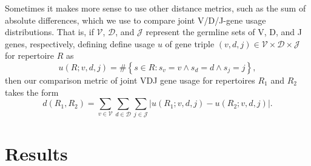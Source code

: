\documentclass{article}
\begin{document}
Sometimes it makes more sense to use other distance metrics, such as the sum of absolute differences, which we use to compare joint V/D/J-gene usage distributions.
That is, if $\mathcal V$, $\mathcal D$, and $\mathcal J$ represent the germline sets of V, D, and J genes, respectively,
defining define usage $u$ of gene triple $(v, d, j) \in \mathcal V \times \mathcal D \times \mathcal J$ for repertoire $R$ as
\begin{equation}
u(R; v, d, j) = \#\left\{s \in R: s_v = v \land s_d = d \land s_j = j\right\},
\end{equation}
then our comparison metric of joint VDJ gene usage for repertoires $R_1$ and $R_2$ takes the form
\begin{equation}
d(R_1, R_2) = \sum_{v \in \mathcal V} \sum_{d \in \mathcal D} \sum_{j \in \mathcal J} \left| u(R_1; v, d, j) - u(R_2; v, d, j) \right|.
\end{equation}




\section*{Results}

\end{document}
